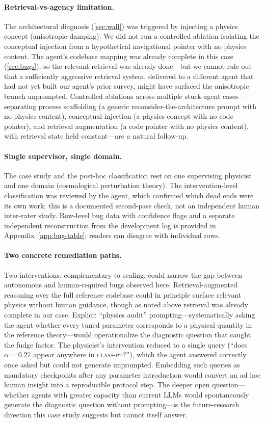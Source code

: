 \documentclass{article}
\newcommand{\classpt}{\textsc{class-pt}\xspace}
\begin{document}
\paragraph{Retrieval-vs-agency limitation.}
The architectural diagnosis (\cref{sec:wall}) was triggered by injecting a physics concept (anisotropic damping). We did not run a controlled ablation isolating the conceptual injection from a hypothetical navigational pointer with no physics content. The agent's codebase mapping was already complete in this case (\cref{sec:bugs}), so the relevant retrieval was already done---but we cannot rule out that a sufficiently aggressive retrieval system, delivered to a different agent that had not yet built our agent's prior survey, might have surfaced the anisotropic branch unprompted. Controlled ablations across multiple stuck-agent cases---separating process scaffolding (a generic reconsider-the-architecture prompt with no physics content), conceptual injection (a physics concept with no code pointer), and retrieval augmentation (a code pointer with no physics content), with retrieval state held constant---are a natural follow-up.

\paragraph{Single supervisor, single domain.}
The case study and the post-hoc classification rest on one supervising physicist and one domain (cosmological perturbation theory). The intervention-level classification was reviewed by the agent, which confirmed which dead ends were its own work; this is a documented second-pass check, not an independent human inter-rater study. Row-level bug data with confidence flags and a separate independent reconstruction from the development log is provided in Appendix~\ref{app:bug-table}; readers can disagree with individual rows.

\paragraph{Two concrete remediation paths.}
Two interventions, complementary to scaling, could narrow the gap between autonomous and human-required bugs observed here. Retrieval-augmented reasoning over the full reference codebase could in principle surface relevant physics without human guidance, though as noted above retrieval was already complete in our case. Explicit ``physics audit'' prompting---systematically asking the agent whether every tuned parameter corresponds to a physical quantity in the reference theory---would operationalize the diagnostic question that caught the fudge factor. The physicist's intervention reduced to a single query (``does $\alpha=0.27$ appear anywhere in \classpt?''), which the agent answered correctly once asked but could not generate unprompted. Embedding such queries as mandatory checkpoints after any parameter introduction would convert an ad hoc human insight into a reproducible protocol step. The deeper open question---whether agents with greater capacity than current LLMs would spontaneously generate the diagnostic question without prompting---is the future-research direction this case study suggests but cannot itself answer.
\end{document}
